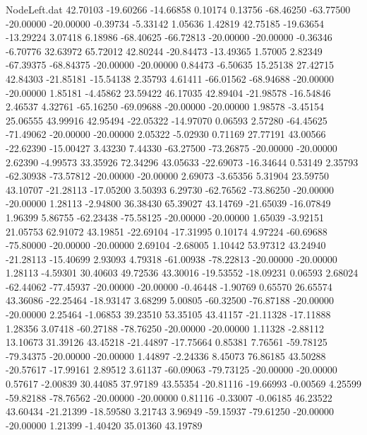\begin{filecontents}{NodeLeft.dat}
  42.70103  -19.60266  -14.66858     0.10174    0.13756  -68.46250  -63.77500  -20.00000  -20.00000   -0.39734   -5.33142    1.05636    1.42819
  42.75185  -19.63654  -13.29224     3.07418    6.18986  -68.40625  -66.72813  -20.00000  -20.00000   -0.36346   -6.70776   32.63972   65.72012
  42.80244  -20.84473  -13.49365     1.57005    2.82349  -67.39375  -68.84375  -20.00000  -20.00000    0.84473   -6.50635   15.25138   27.42715
  42.84303  -21.85181  -15.54138     2.35793    4.61411  -66.01562  -68.94688  -20.00000  -20.00000    1.85181   -4.45862   23.59422   46.17035
  42.89404  -21.98578  -16.54846     2.46537    4.32761  -65.16250  -69.09688  -20.00000  -20.00000    1.98578   -3.45154   25.06555   43.99916
  42.95494  -22.05322  -14.97070     0.06593    2.57280  -64.45625  -71.49062  -20.00000  -20.00000    2.05322   -5.02930    0.71169   27.77191
  43.00566  -22.62390  -15.00427     3.43230    7.44330  -63.27500  -73.26875  -20.00000  -20.00000    2.62390   -4.99573   33.35926   72.34296
  43.05633  -22.69073  -16.34644     0.53149    2.35793  -62.30938  -73.57812  -20.00000  -20.00000    2.69073   -3.65356    5.31904   23.59750
  43.10707  -21.28113  -17.05200     3.50393    6.29730  -62.76562  -73.86250  -20.00000  -20.00000    1.28113   -2.94800   36.38430   65.39027
  43.14769  -21.65039  -16.07849     1.96399    5.86755  -62.23438  -75.58125  -20.00000  -20.00000    1.65039   -3.92151   21.05753   62.91072
  43.19851  -22.69104  -17.31995     0.10174    4.97224  -60.69688  -75.80000  -20.00000  -20.00000    2.69104   -2.68005    1.10442   53.97312
  43.24940  -21.28113  -15.40699     2.93093    4.79318  -61.00938  -78.22813  -20.00000  -20.00000    1.28113   -4.59301   30.40603   49.72536
  43.30016  -19.53552  -18.09231     0.06593    2.68024  -62.44062  -77.45937  -20.00000  -20.00000   -0.46448   -1.90769    0.65570   26.65574
  43.36086  -22.25464  -18.93147     3.68299    5.00805  -60.32500  -76.87188  -20.00000  -20.00000    2.25464   -1.06853   39.23510   53.35105
  43.41157  -21.11328  -17.11888     1.28356    3.07418  -60.27188  -78.76250  -20.00000  -20.00000    1.11328   -2.88112   13.10673   31.39126
  43.45218  -21.44897  -17.75664     0.85381    7.76561  -59.78125  -79.34375  -20.00000  -20.00000    1.44897   -2.24336    8.45073   76.86185
  43.50288  -20.57617  -17.99161     2.89512    3.61137  -60.09063  -79.73125  -20.00000  -20.00000    0.57617   -2.00839   30.44085   37.97189
  43.55354  -20.81116  -19.66993    -0.00569    4.25599  -59.82188  -78.76562  -20.00000  -20.00000    0.81116   -0.33007   -0.06185   46.23522
  43.60434  -21.21399  -18.59580     3.21743    3.96949  -59.15937  -79.61250  -20.00000  -20.00000    1.21399   -1.40420   35.01360   43.19789

\end{filecontents}
